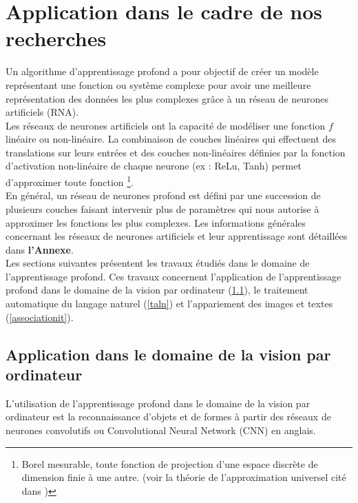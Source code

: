 \section{Application dans le cadre de nos recherches} \label{application}
Un algorithme d'apprentissage profond a pour objectif de créer un modèle représentant une fonction ou système complexe 
pour avoir une meilleure représentation des données les plus complexes grâce à un réseau de neurones artificiels (RNA).\\
\smallskip
\qquad Les réseaux de neurones artificiels ont la capacité de modéliser une fonction $f$ linéaire ou non-linéaire. La combinaison de couches linéaires qui effectuent des translations sur leurs entrées et des couches non-linéaires définies par la fonction d'activation non-linéaire de chaque neurone (ex : ReLu, Tanh) permet d'approximer toute fonction  \footnote{Borel mesurable, toute fonction de projection d'une espace discrète de dimension finie à une autre. (voir la théorie de l'approximation universel cité dans \cite{baldi1989neural})}. \\
En général, un réseau de neurones profond est défini par une succession de plusieurs couches faisant intervenir plus de paramètres qui nous autorise à approximer les fonctions les plus complexes.
Les informations générales concernant les réseaux de neurones artificiels et leur apprentissage sont détaillées dans\textbf{ l'Annexe}.\\
\qquad Les sections suivantes présentent les travaux étudiés dans le domaine de l'apprentissage profond. Ces travaux concernent l'application de l’apprentissage profond dans le domaine de la vision par ordinateur (\ref{vo}), le traitement automatique du langage naturel (\ref{taln}) et l'appariement des images et textes (\ref{associationit}).\\

\subsection{Application dans le domaine de la vision par ordinateur} \label{vo}

L'utilisation de l'apprentissage profond dans le domaine de la vision par ordinateur est la reconnaissance d'objets et de formes à partir des réseaux de neurones convolutifs ou Convolutional Neural Network (CNN) en anglais.\\
\smallskip

